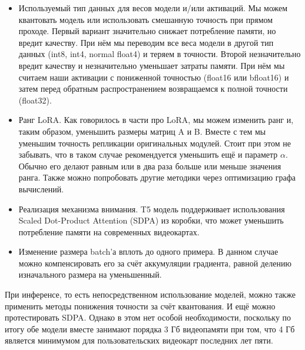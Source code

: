 \begin{itemize}
  \item Используемый тип данных для весов модели и/или активаций.
  Мы можем квантовать модель\cite{lin2024awq} или использовать смешанную точность при прямом проходе\cite{micikevicius2017mixed}.
  Первый вариант значительно снижает потребление памяти, но вредит качеству.
  При нём мы переводим все веса модели в другой тип данных (int8, int4, normal float4) и теряем в точности.
  Второй незначительно вредит качеству и незначительно уменьшает затраты памяти.
  При нём мы считаем наши активации с пониженной точностью (float16 или bfloat16\cite{kalamkar2019study}) и затем перед обратным распространением возвращаемся к полной точности (float32).
  \item Ранг LoRA.
  Как говорилось в части про LoRA, мы можем изменить ранг и, таким образом, уменьшить размеры матриц A и B.
  Вместе с тем мы уменьшим точность репликации оригинальных модулей.
  Стоит при этом не забывать, что в таком случае рекомендуется уменьшить ещё и параметр $\alpha$.
  Обычно его делают равным или в два раза больше или меньше значения ранга.
  Также можно попробовать другие методики через оптимизацию графа вычислений\cite{cherniuk2023run}.
  \item Реализация механизма внимания.
  T5 модель поддерживает использования Scaled Dot-Product Attention (SDPA)\cite{dao2022flashattention,dao2023flashattention} из коробки, что может уменьшить потребление памяти на современных видеокартах.
  \item Изменение размера batch'а вплоть до одного примера.
  В данном случае можно компенсировать его за счёт аккумуляции градиента, равной делению изначального размера на уменьшенный.
\end{itemize}

При инференсе, то есть непосредственном использование моделей, можно также применить методы понижения точности за счёт квантования.
И ещё можно протестировать SDPA.
Однако в этом нет особой необходимости, поскольку по итогу обе модели вместе занимают порядка 3 Гб видеопамяти при том, что 4 Гб является минимумом для пользовательских видеокарт последних лет пяти.

